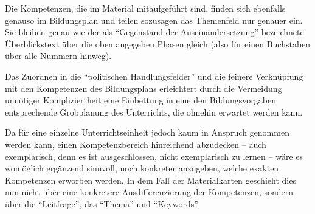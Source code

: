 Die Kompetenzen, die im Material mitaufgeführt sind, finden sich ebenfalls genauso im Bildungsplan und teilen sozusagen das Themenfeld nur genauer ein. Sie bleiben genau wie der als \enquote{Gegenstand der Auseinandersetzung} bezeichnete Überblickstext über die oben angegeben Phasen gleich (also für einen Buchstaben über alle Nummern hinweg). 

Das Zuordnen in die \enquote{politischen Handlungsfelder} und die feinere Verknüpfung mit den Kompetenzen des Bildungsplans erleichtert durch die Vermeidung unnötiger Kompliziertheit eine Einbettung in eine den Bildungsvorgaben entsprechende Grobplanung des Unterrichts, die ohnehin erwartet werden kann.




Da für eine einzelne Unterrichtseinheit jedoch kaum in Anspruch genommen werden kann, einen Kompetenzbereich hinreichend abzudecken -- auch exemplarisch, denn es ist ausgeschlossen, nicht exemplarisch zu lernen -- wäre es womöglich ergänzend sinnvoll, noch konkreter anzugeben, welche exakten Kompetenzen erworben werden.
In dem Fall der Materialkarten geschieht dies nun nicht über eine konkretere Ausdifferenzierung der Kompetenzen, sondern über die \enquote{Leitfrage}, das \enquote{Thema} und \enquote{Keywords}. 


